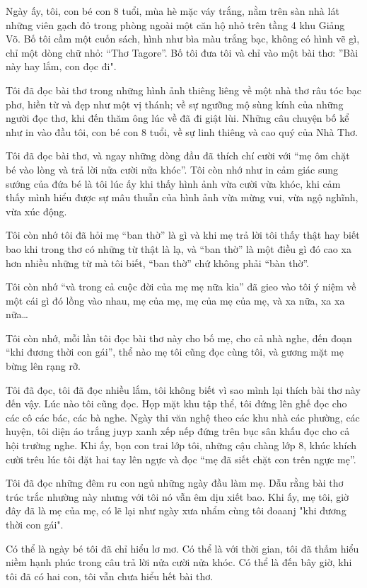 Ngày ấy, tôi, con bé con 8 tuổi, mùa hè mặc váy trắng, nằm trên sàn nhà lát những viên gạch đỏ trong phòng ngoài một căn hộ nhỏ trên tầng 4 khu Giảng Võ. Bố tôi cầm một cuốn sách, hình như bìa màu trắng bạc, không có hình vẽ gì, chỉ một dòng chữ nhỏ: “Thơ Tagore”. Bố tôi đưa tôi và chỉ vào một bài thơ: ”Bài này hay lắm, con đọc đi".

Tôi đã đọc bài thơ trong những hình ảnh thiêng liêng về một nhà thơ râu tóc bạc phơ, hiền từ và đẹp như một vị thánh; về sự ngưỡng mộ sùng kính của những người đọc thơ, khi đến thăm ông lúc về đã đi giật lùi. Những câu chuyện bố kể như in vào đầu tôi, con bé con 8 tuổi, về sự linh thiêng và cao quý của Nhà Thơ.

Tôi đã đọc bài thơ, và ngay những dòng đầu đã thích chí cười với “mẹ ôm chặt bé vào lòng và trả lời nửa cười nửa khóc”. Tôi còn nhớ như in cảm giác sung sướng của đứa bé là tôi lúc ấy khi thấy hình ảnh vừa cười vừa khóc, khi cảm thấy mình hiểu được sự mâu thuẫn của hình ảnh vừa mừng vui, vừa ngộ nghĩnh, vừa xúc động.

Tôi còn nhớ tôi đã hỏi mẹ “ban thờ” là gì và khi mẹ trả lời tôi thấy thật hay biết bao khi trong thơ có những từ thật là lạ, và “ban thờ” là một điều gì đó cao xa hơn nhiều những từ mà tôi biết, “ban thờ” chứ không phải “bàn thờ”.

Tôi còn nhớ “và trong cả cuộc đời của mẹ mẹ nữa kia” đã gieo vào tôi ý niệm về một cái gì đó lồng vào nhau, mẹ của mẹ, mẹ của mẹ của mẹ, và xa nữa, xa xa nữa…

Tôi còn nhớ, mỗi lần tôi đọc bài thơ này cho bố mẹ, cho cả nhà nghe, đến đoạn “khi đương thời con gái”, thể nào mẹ tôi cũng đọc cùng tôi, và gương mặt mẹ bừng lên rạng rỡ.

Tôi đã đọc, tôi đã đọc nhiều lắm, tôi không biết vì sao mình lại thích bài thơ này đến vậy. Lúc nào tôi cũng đọc. Họp mặt khu tập thể, tôi đứng lên ghế đọc cho các cô các bác, các bà nghe. Ngày thi văn nghệ theo các khu nhà các phường, các huyện, tôi diện áo trắng juyp xanh xếp nếp đứng trên bục sân khấu đọc cho cả hội trường nghe. Khi ấy, bọn con trai lớp tôi, những cậu chàng lớp 8, khúc khích cười trêu lúc tôi đặt hai tay lên ngực và đọc “mẹ đã siết chặt con trên ngực mẹ”.


Tôi đã đọc những đêm ru con ngủ những ngày đầu làm mẹ. Dẫu rằng bài thơ trúc trắc nhường này nhưng với tôi nó vẫn êm dịu xiết bao. Khi ấy, mẹ tôi, giờ đây đã là mẹ của mẹ, có lẽ lại như ngày xưa nhẩm cùng tôi đoaanj "khi đương thời con gái".

Có thể là ngày bé tôi đã chỉ hiểu lơ mơ. Có thể là với thời gian, tôi đã thấm hiểu niềm hạnh phúc trong câu trả lời nửa cười nửa khóc. Có thể là đến bây giờ, khi tôi đã có hai con, tôi vẫn chưa hiểu hết bài thơ.

